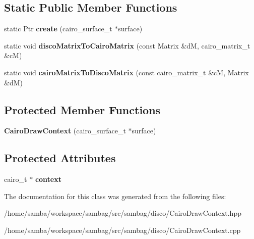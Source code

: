 \subsection*{Static Public Member Functions}
\begin{DoxyCompactItemize}
\item 
\hypertarget{classsambag_1_1disco_1_1_cairo_draw_context_a795a1f519067c93494b37fa8b979a8e1}{
static Ptr {\bfseries create} (cairo\_\-surface\_\-t $\ast$surface)}
\label{classsambag_1_1disco_1_1_cairo_draw_context_a795a1f519067c93494b37fa8b979a8e1}

\item 
\hypertarget{classsambag_1_1disco_1_1_cairo_draw_context_a4af32bfab821439bb98b63d05013a8f0}{
static void {\bfseries discoMatrixToCairoMatrix} (const Matrix \&dM, cairo\_\-matrix\_\-t \&cM)}
\label{classsambag_1_1disco_1_1_cairo_draw_context_a4af32bfab821439bb98b63d05013a8f0}

\item 
\hypertarget{classsambag_1_1disco_1_1_cairo_draw_context_a5f68c203cfc20e95e8a7cb1b81f4b986}{
static void {\bfseries cairoMatrixToDiscoMatrix} (const cairo\_\-matrix\_\-t \&cM, Matrix \&dM)}
\label{classsambag_1_1disco_1_1_cairo_draw_context_a5f68c203cfc20e95e8a7cb1b81f4b986}

\end{DoxyCompactItemize}
\subsection*{Protected Member Functions}
\begin{DoxyCompactItemize}
\item 
\hypertarget{classsambag_1_1disco_1_1_cairo_draw_context_ab8e541f8702af3fc3fe794f4d4ae34a7}{
{\bfseries CairoDrawContext} (cairo\_\-surface\_\-t $\ast$surface)}
\label{classsambag_1_1disco_1_1_cairo_draw_context_ab8e541f8702af3fc3fe794f4d4ae34a7}

\end{DoxyCompactItemize}
\subsection*{Protected Attributes}
\begin{DoxyCompactItemize}
\item 
\hypertarget{classsambag_1_1disco_1_1_cairo_draw_context_ae9ecc565b92d85754e56013e6955f368}{
cairo\_\-t $\ast$ {\bfseries context}}
\label{classsambag_1_1disco_1_1_cairo_draw_context_ae9ecc565b92d85754e56013e6955f368}

\end{DoxyCompactItemize}


The documentation for this class was generated from the following files:\begin{DoxyCompactItemize}
\item 
/home/samba/workspace/sambag/src/sambag/disco/CairoDrawContext.hpp\item 
/home/samba/workspace/sambag/src/sambag/disco/CairoDrawContext.cpp\end{DoxyCompactItemize}
